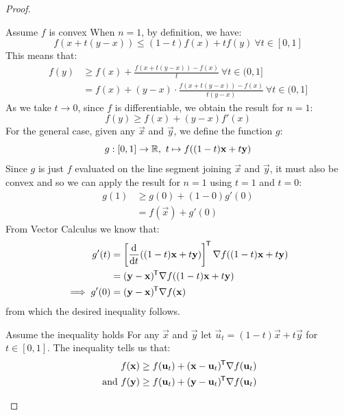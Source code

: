 \documentclass[../main.tex]{subfiles}
\begin{document}
\begin{proof}
  \begin{proofdirection}{Assume $f$ is convex}
    When $n = 1$, by definition, we have:
    \[
      f(x + t(y - x)) \leq (1 - t)f(x) + tf(y)\ \forall t \in [0, 1]
    \]
    This means that:
    \begin{align*}
      f(y) &\geq f(x) + \frac{f(x + t(y - x)) - f(x)}{t}\ \forall t \in (0, 1] \\
           &= f(x) + (y - x) \cdot \frac{f(x + t(y - x)) - f(x)}{t(y - x)}\ \forall t \in (0, 1]
    \end{align*}
    As we take $t \to 0$, since $f$ is differentiable, we obtain the result for $n = 1$:
    \[
      f(y) \geq f(x) + (y - x)f'(x)
    \]
    For the general case, given any $\vec{x}$ and $\vec{y}$, we define the function $g$:
    \begin{equation}
      g: [0, 1] \to \mathbb{R},\ t \mapsto f((1 - t)\mathbf{\bm{x}} + t\mathbf{\bm{y}}) \label{fOnLine}
    \end{equation}
    Since $g$ is just $f$ evaluated on the line segment joining $\vec{x}$ and $\vec{y}$, it must also be convex and so we can apply the result for $n = 1$ using $t = 1$ and $t = 0$:
    \begin{align*}
      g(1) &\geq g(0) + (1 - 0)g'(0) \\
           &= f(\vec{x}) + g'(0)
    \end{align*}
    From Vector Calculus we know that:
    \begin{align*}
      g'(t) &= \left[\deriv{}{t}((1 - t)\vec{x} + t\vec{y})\right]^{\trans} \nabla f((1 - t)\vec{x} + t \vec{y}) \\
            &= (\vec{y} - \vec{x})^{\trans} \nabla f((1 - t)\vec{x} + t \vec{y}) \\
      \implies g'(0) &= (\vec{y} - \vec{x})^{\trans} \nabla f(\vec{x})
    \end{align*}
    from which the desired inequality follows.
  \end{proofdirection}
  \begin{proofdirection}{Assume the inequality holds}
    For any $\vec{x}$ and $\vec{y}$ let $\vec{u}_t = (1 - t)\vec{x} + t\vec{y}$ for $t \in [0, 1]$.
    The inequality tells us that:
    \begin{align*}
      f(\mathbf{\bm{x}}) \geq f(\mathbf{\bm{u}}_t) + (\mathbf{\bm{x}} - \mathbf{\bm{u}}_t)^{{\mkern-1.5mu\mathsf{T}}} \nabla f(\mathbf{\bm{u}}_t) \\
      \text{ and } f(\mathbf{\bm{y}}) \geq f(\mathbf{\bm{u}}_t) + (\mathbf{\bm{y}} - \mathbf{\bm{u}}_t)^{{\mkern-1.5mu\mathsf{T}}} \nabla f(\mathbf{\bm{u}}_t)
    \end{align*}

\end{proofdirection}
\end{proof}
\end{document}
